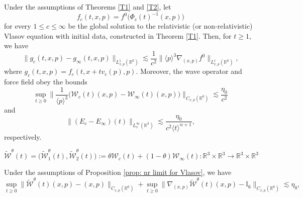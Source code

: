 \documentclass[10pt,a4paper]{amsart}
\begin{document}
\begin{proposition}\label{prop: nr limit for Vlasov}
Under the assumptions of Theorems \ref{T1} and \ref{T2}, let
$$f_c(t,x,p)=f^0\Big(\Phi_c(t)^{-1}(x,p)\Big)$$
for every $1 \leq c \leq \infty$
be the global solution to the relativistic (or non-relativistic) Vlasov equation with initial data,  constructed in Theorem \ref{T1}. Then, for $t\geq 1$, we have
\begin{equation}\label{eq: nr limit for Vlasov}
\|g_c(t,x,p)-g_\infty(t,x,p)\|_{L_{x,p}^1(\mathbb{R}^6)}\lesssim \frac{1}{c^2} \|\langle p \rangle^3\nabla_{(x,p)}f^0\|_{L_{x,p}^1(\mathbb{R}^6)},
\end{equation}
where $g_c(t,x,p)=f_c(t,x+tv_c(p),p)$. Moreover, the wave operator and force field obey the bounds
\begin{equation}\label{eq: nr limit for wave operators}
\sup_{t\geq0}\bigg\|\frac{1}{\langle p\rangle^3}\Big(\mathcal{W}_c(t)(x,p)-\mathcal{W}_\infty(t)(x,p)\Big)\bigg\|_{C_{x,p}(\mathbb{R}^6)}\lesssim \frac{\eta_0}{c^2}
\end{equation}
and
\begin{equation}\label{eq: nr limit for force field}
\|(E_c-E_\infty)(t)\|_{L_x^\infty(\mathbb{R}^3)}\lesssim\frac{\eta_0}{c^2\langle t\rangle^{\alpha+1}},
\end{equation}
respectively.
\end{proposition}

\begin{equation}\label{eq: interpolated wave operator}
\widetilde{\mathcal{W}}^\theta(t)=\big(\widetilde{\mathcal{W}}_1^\theta(t),\widetilde{\mathcal{W}}_2^\theta(t)\big):=\theta\mathcal{W}_c(t)+(1-\theta)\mathcal{W}_\infty(t):\mathbb{R}^3\times\mathbb{R}^3\to\mathbb{R}^3\times\mathbb{R}^3
\end{equation}

\begin{lemma}\label{lemma: interpolated wave operator}
Under the assumptions of Proposition \ref{prop: nr limit for Vlasov}, we have
\begin{equation}\label{eq: interpolated wave operator, almost identity}
\sup_{t\geq0}\big\|\widetilde{\mathcal{W}}^\theta(t)(x,p)-(x,p)\big\|_{C_{x,p}(\mathbb{R}^6)}+\sup_{t\geq0}\big\|\nabla_{(x,p)}\widetilde{\mathcal{W}}^\theta(t)(x,p)-\mathbb{I}_6\big\|_{C_{x,p}(\mathbb{R}^6)}\lesssim\eta_0, 
\end{equation}
\end{lemma}
\end{document}

